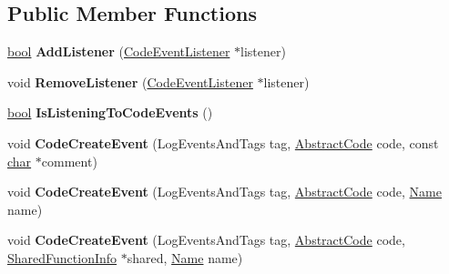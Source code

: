 \subsection*{Public Member Functions}
\begin{DoxyCompactItemize}
\item 
\mbox{\label{classv8_1_1internal_1_1CodeEventDispatcher_abcdebd05d105616fe5014b343fb6aa49}} 
\mbox{\hyperlink{classbool}{bool}} {\bfseries Add\+Listener} (\mbox{\hyperlink{classv8_1_1internal_1_1CodeEventListener}{Code\+Event\+Listener}} $\ast$listener)
\item 
\mbox{\label{classv8_1_1internal_1_1CodeEventDispatcher_a6bd3eda2fe016ade7813bad27191684c}} 
void {\bfseries Remove\+Listener} (\mbox{\hyperlink{classv8_1_1internal_1_1CodeEventListener}{Code\+Event\+Listener}} $\ast$listener)
\item 
\mbox{\label{classv8_1_1internal_1_1CodeEventDispatcher_a9725587a57fa08465365d34ec2a8add3}} 
\mbox{\hyperlink{classbool}{bool}} {\bfseries Is\+Listening\+To\+Code\+Events} ()
\item 
\mbox{\label{classv8_1_1internal_1_1CodeEventDispatcher_a7c3cc7c19f8cc9f0c8f7175e96cfaad1}} 
void {\bfseries Code\+Create\+Event} (Log\+Events\+And\+Tags tag, \mbox{\hyperlink{classv8_1_1internal_1_1AbstractCode}{Abstract\+Code}} code, const \mbox{\hyperlink{classchar}{char}} $\ast$comment)
\item 
\mbox{\label{classv8_1_1internal_1_1CodeEventDispatcher_a2e5b09470456f1e3ff99a592d4d9f2d2}} 
void {\bfseries Code\+Create\+Event} (Log\+Events\+And\+Tags tag, \mbox{\hyperlink{classv8_1_1internal_1_1AbstractCode}{Abstract\+Code}} code, \mbox{\hyperlink{classv8_1_1internal_1_1Name}{Name}} name)
\item 
\mbox{\label{classv8_1_1internal_1_1CodeEventDispatcher_a195a8a598000fab6ead0860cd1c11312}} 
void {\bfseries Code\+Create\+Event} (Log\+Events\+And\+Tags tag, \mbox{\hyperlink{classv8_1_1internal_1_1AbstractCode}{Abstract\+Code}} code, \mbox{\hyperlink{classv8_1_1internal_1_1SharedFunctionInfo}{Shared\+Function\+Info}} $\ast$shared, \mbox{\hyperlink{classv8_1_1internal_1_1Name}{Name}} name)

\end{DoxyCompactItemize}
